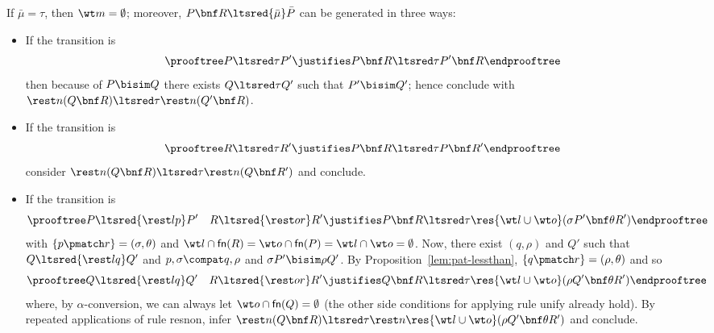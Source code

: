 \documentclass{LMCS}
\newcommand{\withsetnot}[2]{#2}
\begin{document}
If $\bar\mu = \tau$, then $\wt m = \emptyset$; moreover, $P\bnf R \ltsred{\bar\mu} \bar P$ can
be generated in three ways:
\begin{itemize}
\item If the transition is
	\begin{equation*}
	\prooftree P\ltsred\tau P'
	\justifies P\bnf R\ltsred\tau P'\bnf R
	\endprooftree
	\end{equation*}
	then because of $P\bisim Q$ there exists $Q\ltsred\tau Q'$
        such that $P' \bisim Q'$; hence conclude with
	$\rest n (Q\bnf R) \ltsred\tau \rest n(Q'\bnf R)$.
\item If the transition is
	\begin{equation*}
	\prooftree R\ltsred\tau R'
	\justifies P\bnf R\ltsred\tau P\bnf R'
	\endprooftree
	\end{equation*}
	consider $\rest n (Q\bnf R) \ltsred\tau \rest n(Q\bnf R')$ and conclude.
\item If the transition is
	\begin{equation*}
	\prooftree P \ltsred{\rest l p} P' \quad R \ltsred{\rest o r} R'
	\justifies P\bnf R \ltsred\tau \res{\withsetnot{\wt l,\wt o}{\wt l\cup\wt o}}(\sigma P'\bnf\theta R')
	\endprooftree
	\end{equation*}
	with $\{p \pmatch r\} = (\sigma, \theta)$ and
	$\wt l \cap {\sf fn}(R) = \wt o \cap {\sf fn}(P) = \wt l\cap\wt o = \emptyset$.
	Now, there exist $(q,\rho)$ and $Q'$ such that $Q\ltsred{\rest l q}Q'$ and
	$p,\sigma\compat q,\rho$ and $\sigma P'\bisim\rho Q'$.
	By Proposition~\ref{lem:pat-lessthan}, $\{q\pmatch r\}=(\rho,\theta)$
	and so
	\begin{equation*}
	\prooftree Q \ltsred{\rest l q} Q' \quad R \ltsred{\rest o r} R'
	\justifies Q\bnf R \ltsred\tau \res{\withsetnot{\wt l,\wt o}{\wt l\cup\wt o}}(\rho Q'\bnf\theta R')
	\endprooftree
	\end{equation*}
	where, by $\alpha$-conversion, we can always let $\wt o\cap{\sf fn}(Q) = \emptyset$
	(the other side conditions for applying rule {\sf unify} already hold).
	By repeated applications of rule {\sf resnon}, infer 
	$\rest n (Q\bnf R) \ltsred\tau \rest n\res{\withsetnot{\wt l,\wt o}{\wt l\cup\wt o}}(\rho Q'\bnf\theta R')$
	and conclude.
\end{itemize}
\end{document}
